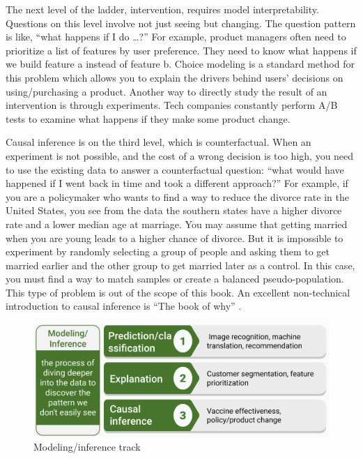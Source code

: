 \documentclass[
  12pt,
]{krantz}
\begin{document}
The next level of the ladder, intervention, requires model interpretability. Questions on this level involve not just seeing but changing. The question pattern is like, ``what happens if I do \ldots?'' For example, product managers often need to prioritize a list of features by user preference. They need to know what happens if we build feature a instead of feature b. Choice modeling is a standard method for this problem which allows you to explain the drivers behind users' decisions on using/purchasing a product. Another way to directly study the result of an intervention is through experiments. Tech companies constantly perform A/B tests to examine what happens if they make some product change.

Causal inference is on the third level, which is counterfactual. When an experiment is not possible, and the cost of a wrong decision is too high, you need to use the existing data to answer a counterfactual question: ``what would have happened if I went back in time and took a different approach?'' For example, if you are a policymaker who wants to find a way to reduce the divorce rate in the United States, you see from the data the southern states have a higher divorce rate and a lower median age at marriage. You may assume that getting married when you are young leads to a higher chance of divorce. But it is impossible to experiment by randomly selecting a group of people and asking them to get married earlier and the other group to get married later as a control. In this case, you must find a way to match samples or create a balanced pseudo-population. This type of problem is out of the scope of this book. An excellent non-technical introduction to causal inference is ``The book of why'' \citep{Judea2019}.

\begin{figure}

{\centering \includegraphics[width=0.8\linewidth]{images/track3_modeling} 

}

\caption{Modeling/inference track}\label{fig:track3modeling}
\end{figure}
\end{document}
